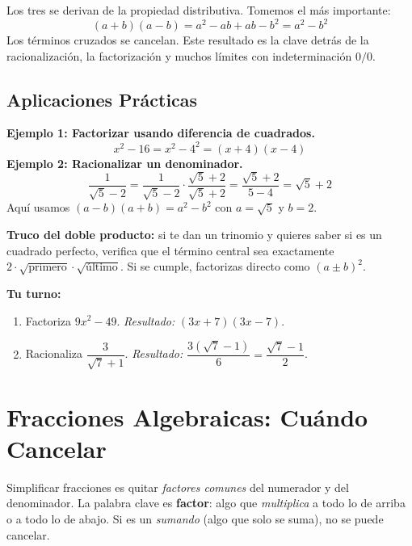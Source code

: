 \documentclass[12pt, letterpaper]{article}
\begin{document}
Los tres se derivan de la propiedad distributiva. Tomemos el más importante:
\[
  (a+b)(a-b) = a^2 - ab + ab - b^2 = a^2 - b^2
\]
Los términos cruzados se cancelan. Este resultado es la clave detrás de la racionalización, la factorización y muchos límites con indeterminación $0/0$.

\subsection{Aplicaciones Prácticas}

\begin{cuadropasos}
  \textbf{Ejemplo 1: Factorizar usando diferencia de cuadrados.}
  \[
    x^2 - 16 = x^2 - 4^2 = (x+4)(x-4)
  \]
  \textbf{Ejemplo 2: Racionalizar un denominador.}
  \[
    \frac{1}{\sqrt{5} - 2} = \frac{1}{\sqrt{5} - 2}\cdot\frac{\sqrt{5}+2}{\sqrt{5}+2}
    = \frac{\sqrt{5}+2}{5 - 4} = \sqrt{5}+2
  \]
  Aquí usamos $(a-b)(a+b) = a^2 - b^2$ con $a = \sqrt{5}$ y $b = 2$.
\end{cuadropasos}

\begin{cuadroextra}
  \textbf{Truco del doble producto:} si te dan un trinomio y quieres saber si es un cuadrado perfecto, verifica que el término central sea exactamente $2 \cdot \sqrt{\text{primero}} \cdot \sqrt{\text{último}}$. Si se cumple, factorizas directo como $(a \pm b)^2$.
\end{cuadroextra}

\noindent\textbf{Tu turno:}
\begin{enumerate}[leftmargin=*]
  \item Factoriza $9x^2 - 49$. \emph{Resultado:} $(3x+7)(3x-7)$.
  \item Racionaliza $\dfrac{3}{\sqrt{7}+1}$. \emph{Resultado:} $\dfrac{3(\sqrt{7}-1)}{6} = \dfrac{\sqrt{7}-1}{2}$.
\end{enumerate}


\section{Fracciones Algebraicas: Cuándo Cancelar}

Simplificar fracciones es quitar \emph{factores comunes} del numerador y del denominador. La palabra clave es \textbf{factor}: algo que \emph{multiplica} a todo lo de arriba o a todo lo de abajo. Si es un \emph{sumando} (algo que solo se suma), no se puede cancelar.
\end{document}
